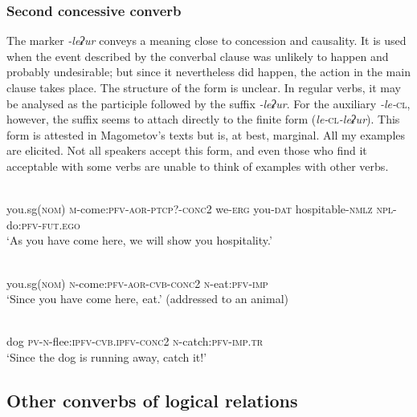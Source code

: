 ﻿\documentclass[output=paper]{langsci/langscibook}
\begin{document}
\subsubsection{Second concessive converb}

The marker \emph{-leʡur} conveys a meaning close to concession and
causality. It is used when the event described by the converbal clause
was unlikely to happen and probably undesirable; but since it
nevertheless did happen, the action in the main clause takes place. The
structure of the form is unclear. In regular verbs, it may be analysed as 
the participle followed by the suffix \emph{-leʡur}. For the auxiliary \mbox{\emph{-le-}\textsc{cl}}, 
however, the suffix seems to attach directly to the finite form (\mbox{\emph{le-}\textsc{cl}\emph{-leʡur}}). 
This form is attested in Magometov's texts but is, at best, marginal. All my examples are elicited.
Not all speakers accept this form, and even those who find it acceptable with some verbs are 
unable to think of examples with other verbs. 

\ea \label{ex:8:31} %
\\
you.sg(\textsc{nom}) \textsc{m}-come:\textsc{pfv}-\textsc{aor}-\textsc{ptcp?}-\textsc{conc2} we-\textsc{erg} you-\textsc{dat} hospitable-\textsc{nmlz} \textsc{npl}-do:\textsc{pfv}-\textsc{fut.ego}\\
\glt `As you have come here, we will show you hospitality.'

\ex \label{ex:8:32} %
\\
you.sg(\textsc{nom}) \textsc{n}-come:\textsc{pfv}-\textsc{aor}-\textsc{cvb}-\textsc{conc2} \textsc{n}-eat:\textsc{pfv}-\textsc{imp}\\
\glt `Since you have come here, eat.' (addressed to an animal)

\ex \label{ex:8:33} %
\\
dog \textsc{pv}-\textsc{n}-flee:\textsc{ipfv}-\textsc{cvb.ipfv}-\textsc{conc2} \textsc{n}-catch:\textsc{pfv}-\textsc{imp}.\textsc{tr}\\
\glt `Since the dog is running away, catch it!'
\z

\removelastskip
{}

\subsection{Other converbs of logical relations}
\end{document}
